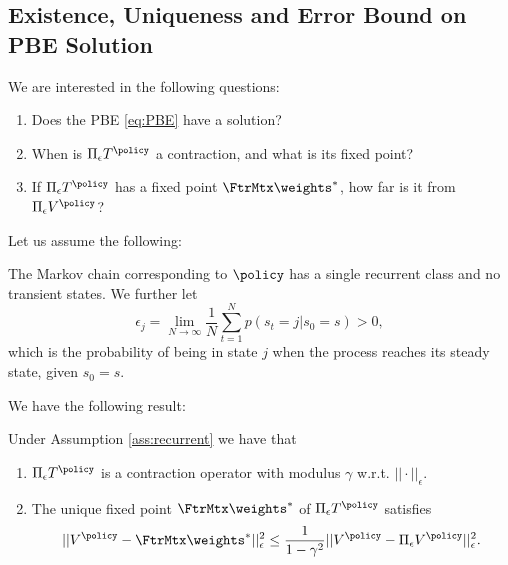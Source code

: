 \subsection{Existence, Uniqueness and Error Bound on PBE Solution}
We are interested in the following questions:
\begin{enumerate}
\item Does the PBE \eqref{eq:PBE} have a solution?
\item When is $\Pi_\epsilon T^\policy$ a contraction, and what is its fixed point?
\item If $\Pi_\epsilon T^\policy$ has a fixed point $\FtrMtx\weights^*$, how far is it from $\Pi_\epsilon V^\policy$?
\end{enumerate}
Let us assume the following:
\begin{assumption}\label{ass:recurrent}The Markov chain corresponding to $\policy$ has a single recurrent class and no transient states. We further let
$$\epsilon_j = \lim_{N\rightarrow \infty} \frac{1}{N} \sum_{t=1}^N p(s_t=j|s_0=s)>0,$$
which is the probability of being in state $j$ when the process reaches its steady state, given $s_0=s$.
\end{assumption}
We have the following result:
\begin{proposition}\label{prop:PBE_contraction} Under Assumption \ref{ass:recurrent} we have that
\begin{enumerate}
\item $\Pi_\epsilon T^\policy$ is a contraction operator with modulus $\gamma$ w.r.t. $||\cdot||_\epsilon$.
\item The unique fixed point $\FtrMtx \weights^*$ of $\Pi_\epsilon T^\policy$ satisfies
$$||V^\policy - \FtrMtx \weights^*||_\epsilon^2 \le \frac{1}{1-\gamma^2}||V^\policy-\Pi_\epsilon V^\policy||_\epsilon^2.$$
\end{enumerate}
\end{proposition}
